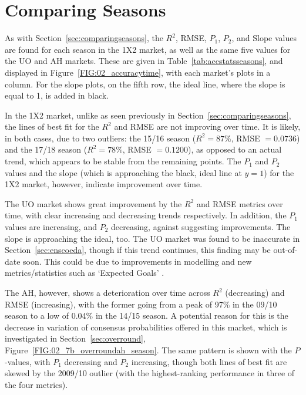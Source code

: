 \documentclass[a4paper,10pt]{report}
\begin{document}
\pagebreak
 
\section{Comparing Seasons} \label{sec:comparingseasonsensco}
As with Section~\ref{sec:comparingseasons}, the $R^2$, RMSE, $P_1$, $P_2$, and Slope values are found for each season in the 1X2 market, as well as the same five values for the UO and AH markets. These are given in Table~\ref{tab:accstatsseasons}, and displayed in Figure~\ref{FIG:02_accuracytime}, with each market's plots in a column. For the slope plots, on the fifth row, the ideal line, where the slope is equal to 1, is added in black.\vspace{3mm}

In the 1X2 market, unlike as seen previously in Section~\ref{sec:comparingseasons}, the lines of best fit for the $R^2$ and RMSE are not improving over time. It is likely, in both cases, due to two outliers: the 15/16 season ($R^2 = 87\%$, RMSE $=0.0736$) and the 17/18 season ($R^2 = 78\%$, RMSE $= 0.1200$), as opposed to an actual trend, which appears to be stable from the remaining points. The $P_1$ and $P_2$ values and the slope (which is approaching the black, ideal line at $y=1$) for the 1X2 market, however, indicate improvement over time. \vspace{3mm}

The UO market shows great improvement by the $R^2$ and RMSE metrics over time, with clear increasing and decreasing trends respectively. In addition, the $P_1$ values are increasing, and $P_2$ decreasing, against suggesting improvements. The slope is approaching the ideal, too. The UO market was found to be inaccurate in Section~\ref{sec:enscoeda}, though if this trend continues, this finding may be out-of-date soon. This could be due to improvements in modelling and new metrics/statistics such as `Expected Goals' \autocite{xgoals, xgoals2}. \vspace{3mm}

The AH, however, shows a deterioration over time across $R^2$ (decreasing) and RMSE (increasing), with the former going from a peak of 97\% in the 09/10 season to a low of 0.04\% in the 14/15 season. A potential reason for this is the decrease in variation of consensus probabilities offered in this market, which is investigated in Section~\ref{sec:overround}, Figure~\ref{FIG:02_7b_overroundah_season}. The same pattern is shown with the $P$-values, with $P_1$ decreasing and $P_2$ increasing, though both lines of best fit are skewed by the 2009/10 outlier (with the highest-ranking performance in three of the four metrics). 
\end{document}
